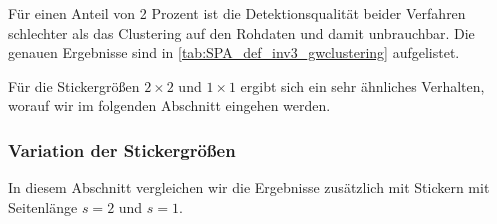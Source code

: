 \documentclass[twoside, 12pt,a4paper]{book}
\numberwithin{equation}{section}
\begin{document}
	 \noindent Für einen Anteil von 2 Prozent ist die Detektionsqualität beider Verfahren schlechter als das Clustering auf den Rohdaten und damit unbrauchbar. Die genauen Ergebnisse sind in \autoref{tab:SPA_def_inv3_gwclustering} aufgelistet.
	 \begin{table}[ht]
	 	\begin{center}
	 		\caption[Ergebnisse für Standard-Angriffe]{Qualität der Detektion unterschiedlich starker Angriffe mithilfe des \ac{lrp}-Clusterings und \ac{gwd}. Die Seitenlänge des Stickers beträgt ${s=3}$~Pixel.}
	 		
	 		\label{tab:SPA_def_inv3_gwclustering}	
	 	\end{center}
	 \end{table}
 
	 \noindent Für die Stickergrößen $2\times 2$ und $1\times 1$ ergibt sich ein sehr ähnliches Verhalten, worauf wir im folgenden Abschnitt eingehen werden.
	 
	
	
	
	
		
	


\subsubsection{Variation der Stickergrößen} 
In diesem Abschnitt vergleichen wir die Ergebnisse zusätzlich mit Stickern mit Seitenlänge $s=2$ und $s=1$.
\end{document}
